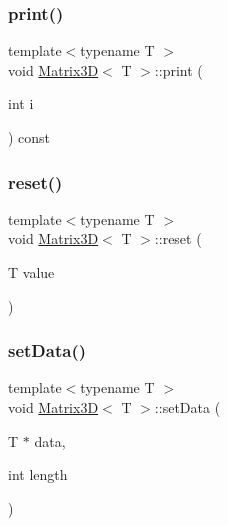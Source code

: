 \mbox{\label{classMatrix3D_abc1d3451a2fb3cce0bec1d1e33097b1e}} 
\subsubsection{\texorpdfstring{print()}{print()}}
{\footnotesize\ttfamily template$<$typename T $>$ \\
void \mbox{\hyperlink{classMatrix3D}{Matrix3D}}$<$ T $>$\+::print (\begin{DoxyParamCaption}\item[{int}]{i }\end{DoxyParamCaption}) const}

\mbox{\label{classMatrix3D_ac67d3ee632ccafaac86dfacdda95dfdf}} 
\subsubsection{\texorpdfstring{reset()}{reset()}}
{\footnotesize\ttfamily template$<$typename T $>$ \\
void \mbox{\hyperlink{classMatrix3D}{Matrix3D}}$<$ T $>$\+::reset (\begin{DoxyParamCaption}\item[{T}]{value }\end{DoxyParamCaption})}

\mbox{\label{classMatrix3D_a056c035f4997b14c2a3e2b8ebee5142c}} 
\subsubsection{\texorpdfstring{set\+Data()}{setData()}}
{\footnotesize\ttfamily template$<$typename T $>$ \\
void \mbox{\hyperlink{classMatrix3D}{Matrix3D}}$<$ T $>$\+::set\+Data (\begin{DoxyParamCaption}\item[{T $\ast$}]{data,  }\item[{int}]{length }\end{DoxyParamCaption})}

\mbox{\label{classMatrix3D_a46a7b732a44b77f6c09f72c0ae05edef}} 
